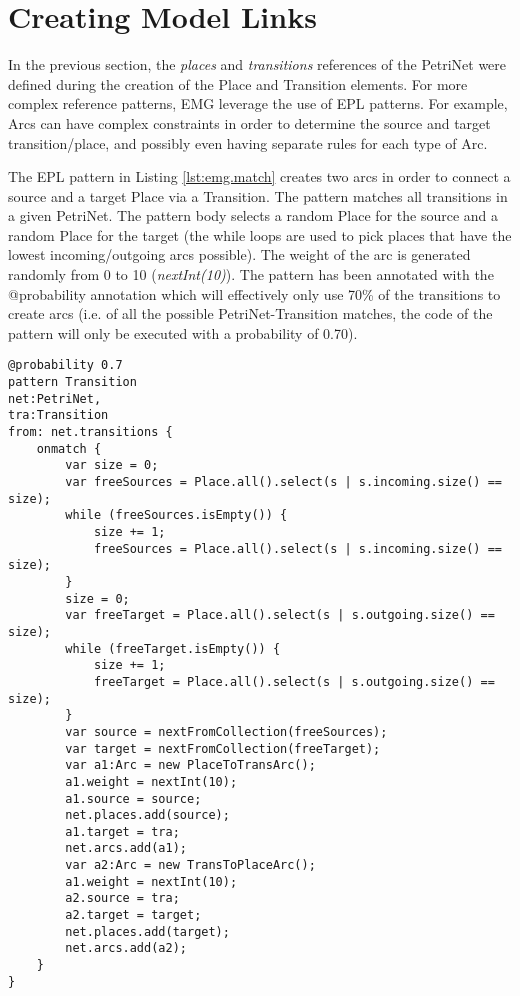 \section{Creating Model Links}\label{sec:emg.createlinks}

In the previous section, the \emph{places} and \emph{transitions} references of the PetriNet were defined during the creation of the Place and Transition elements. For more complex reference patterns, EMG leverage the use of EPL patterns. For example, Arcs can have complex constraints in order to determine the source and target transition/place, and possibly even having separate rules for each type of Arc.

The EPL pattern in Listing \ref{lst:emg.match} creates two arcs in order to connect a source and a target Place via a Transition. The pattern matches all transitions in a given PetriNet.  The pattern body selects a random Place for the source and a random Place for the target (the while loops are used to pick places that have the lowest incoming/outgoing arcs possible). The weight of the arc is generated randomly from 0 to 10 (\emph{nextInt(10)}). The pattern has been annotated with the @probability annotation which will effectively only use 70\% of the transitions to create arcs (i.e. of all the possible PetriNet-Transition matches, the code of the pattern will only be executed with a probability of 0.70).

\begin{lstlisting}[float=h, caption={EMG create operations}, label=lst:emg.match, language=EPL]
@probability 0.7
pattern Transition
net:PetriNet,
tra:Transition
from: net.transitions {
    onmatch {
        var size = 0;
        var freeSources = Place.all().select(s | s.incoming.size() == size);
        while (freeSources.isEmpty()) {
            size += 1;
            freeSources = Place.all().select(s | s.incoming.size() == size);
        }
        size = 0;
        var freeTarget = Place.all().select(s | s.outgoing.size() == size);
        while (freeTarget.isEmpty()) {
            size += 1;
            freeTarget = Place.all().select(s | s.outgoing.size() == size);
        }
        var source = nextFromCollection(freeSources);
        var target = nextFromCollection(freeTarget);
        var a1:Arc = new PlaceToTransArc();
        a1.weight = nextInt(10);
        a1.source = source;
        net.places.add(source);
        a1.target = tra;
        net.arcs.add(a1);
        var a2:Arc = new TransToPlaceArc();
        a1.weight = nextInt(10);
        a2.source = tra;
        a2.target = target;
        net.places.add(target);
        net.arcs.add(a2);
    }
}
\end{lstlisting}

